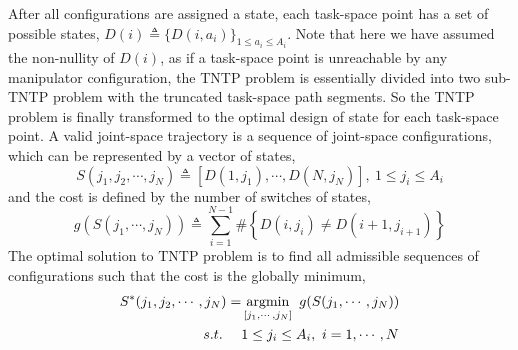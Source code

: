 \documentclass[letterpaper, 10 pt, conference]{ieeeconf}  %
\begin{document}
After all configurations are assigned a state, each task-space point has a set of possible states, $D(i)\triangleq \{D(i, a_i)\}_{1\leq a_i\leq A_i}$. 
Note that here we have assumed the non-nullity of $D(i)$, as if a task-space point is unreachable by any manipulator configuration, the TNTP problem is essentially divided into two sub-TNTP problem with the truncated task-space path segments. 
So the TNTP problem is finally transformed to the optimal design of state for each task-space point. 
A valid joint-space trajectory is a sequence of joint-space configurations, which can be represented by a vector of states,
\begin{equation}
S(j_1, j_2, \cdots, j_N) \triangleq [D(1, j_1), \cdots, D(N, j_N)],\ 1\leq j_i\leq A_i
\end{equation}
and the cost is defined by the number of switches of states, 
\begin{equation}\label{equ:cost}
g\left(S(j_1, \cdots, j_N)\right) \triangleq \sum\limits_{i = 1}^{N-1}\#\left\{D(i, j_i)\neq D(i+1, j_{i+1})\right\}
\end{equation}
The optimal solution to TNTP problem is to find all admissible sequences of configurations such that the cost is the globally minimum, 
\begin{equation}
\begin{aligned}
S^*(j_1, j_2, \cdots, j_N) = &\mathop{\rm argmin}\limits_{[j_1, \cdots, j_N]}~g(S(j_1, \cdots, j_N))\\
s.t.~~~~ &1\leq j_i\leq A_i,\ i = 1, \cdots, N
\end{aligned}
\end{equation}





\end{document}
